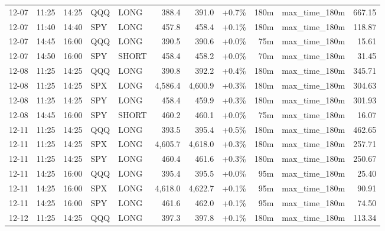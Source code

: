 \documentclass[11pt,a4paper,twoside]{article}
\begin{document}
\begin{center}
\begin{longtable}{>{\color{txtmain}}l l l l l r r r r >{\color{txtmain}}l r}
12-07 & 11:25 & 14:25 & QQQ & LONG & 388.4 & 391.0 & \textcolor{wingreen}{+0.7\%} & 180m & max\_time\_180m & \textcolor{wingreen}{667.15} \\
12-07 & 11:40 & 14:40 & SPY & LONG & 457.8 & 458.4 & \textcolor{wingreen}{+0.1\%} & 180m & max\_time\_180m & \textcolor{wingreen}{118.87} \\
12-07 & 14:45 & 16:00 & QQQ & LONG & 390.5 & 390.6 & \textcolor{wingreen}{+0.0\%} & 75m & max\_time\_180m & \textcolor{wingreen}{15.61} \\
12-07 & 14:50 & 16:00 & SPY & SHORT & 458.4 & 458.2 & \textcolor{wingreen}{+0.0\%} & 70m & max\_time\_180m & \textcolor{wingreen}{31.45} \\
12-08 & 11:25 & 14:25 & QQQ & LONG & 390.8 & 392.2 & \textcolor{wingreen}{+0.4\%} & 180m & max\_time\_180m & \textcolor{wingreen}{345.71} \\
12-08 & 11:25 & 14:25 & SPX & LONG & 4,586.4 & 4,600.9 & \textcolor{wingreen}{+0.3\%} & 180m & max\_time\_180m & \textcolor{wingreen}{304.63} \\
12-08 & 11:25 & 14:25 & SPY & LONG & 458.4 & 459.9 & \textcolor{wingreen}{+0.3\%} & 180m & max\_time\_180m & \textcolor{wingreen}{301.93} \\
12-08 & 14:45 & 16:00 & SPY & SHORT & 460.2 & 460.1 & \textcolor{wingreen}{+0.0\%} & 75m & max\_time\_180m & \textcolor{wingreen}{16.07} \\
12-11 & 11:25 & 14:25 & QQQ & LONG & 393.5 & 395.4 & \textcolor{wingreen}{+0.5\%} & 180m & max\_time\_180m & \textcolor{wingreen}{462.65} \\
12-11 & 11:25 & 14:25 & SPX & LONG & 4,605.7 & 4,618.0 & \textcolor{wingreen}{+0.3\%} & 180m & max\_time\_180m & \textcolor{wingreen}{257.71} \\
12-11 & 11:25 & 14:25 & SPY & LONG & 460.4 & 461.6 & \textcolor{wingreen}{+0.3\%} & 180m & max\_time\_180m & \textcolor{wingreen}{250.67} \\
12-11 & 14:25 & 16:00 & QQQ & LONG & 395.4 & 395.5 & \textcolor{wingreen}{+0.0\%} & 95m & max\_time\_180m & \textcolor{wingreen}{25.40} \\
12-11 & 14:25 & 16:00 & SPX & LONG & 4,618.0 & 4,622.7 & \textcolor{wingreen}{+0.1\%} & 95m & max\_time\_180m & \textcolor{wingreen}{90.91} \\
12-11 & 14:25 & 16:00 & SPY & LONG & 461.6 & 462.0 & \textcolor{wingreen}{+0.1\%} & 95m & max\_time\_180m & \textcolor{wingreen}{74.50} \\
12-12 & 11:25 & 14:25 & QQQ & LONG & 397.3 & 397.8 & \textcolor{wingreen}{+0.1\%} & 180m & max\_time\_180m & \textcolor{wingreen}{113.34} \\

\end{longtable}
\end{center}
\end{document}
